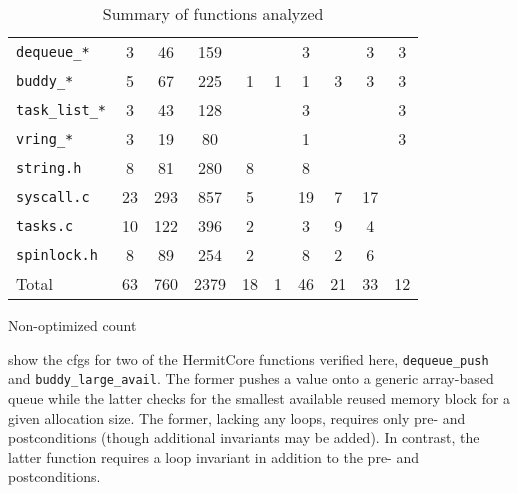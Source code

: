 \begin{table*}
  \renewcommand\theadalign{tc}
  \centering
  \begin{threeparttable}
    \caption{Summary of functions analyzed}
    \label{tbl:functions}
    \begin{tabular}{lSSSSSSSS S[table-figures-integer=2]}
      \toprule
       & {} & {} &
      {} & {} & {} &
      {} & {} & {} &
      {} \\
      \midrule
      \lstinline|dequeue_*| & 3 & 46 & 159 &&& 3 && 3 & 3 \\
      \lstinline|buddy_*| & 5 & 67 & 225 & 1 & 1 & 1 & 3 & 3 & 3 \\
      \lstinline|task_list_*| & 3 & 43 & 128 &&& 3 &&& 3 \\
      \lstinline|vring_*| & 3 & 19 & 80 &&& 1 &&& 3 \\
      \lstinline|string.h| & 8 & 81 & 280 & 8 && 8 &&& \\
      \lstinline|syscall.c| & 23 & 293 & 857 & 5 && 19 & 7 & 17 & \\
      \lstinline|tasks.c| & 10 & 122 & 396 & 2 && 3 & 9 & 4 & \\
      \lstinline|spinlock.h| & 8 & 89 & 254 & 2 && 8 & 2 & 6 & \\
      Total & 63 & 760 & 2379 & 18 & 1 & 46 & 21 & 33 & 12 \\
      \bottomrule
    \end{tabular}
    \begin{tablenotes}
      \item[\dag] Non-optimized count
    \end{tablenotes}
  \end{threeparttable}
\end{table*}

 show the \acp{cfg} for two of
the HermitCore functions verified here,
\lstinline|dequeue_push| and \lstinline|buddy_large_avail|.
The former pushes a value onto a generic array-based queue
while the latter checks for the smallest available reused memory block
for a given allocation size.
The former, lacking any loops, requires only pre- and postconditions
(though additional invariants may be added).
In contrast, the latter function
requires a loop invariant in addition to the pre- and postconditions.

